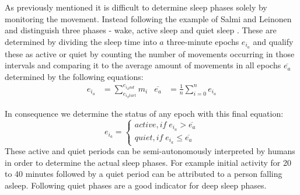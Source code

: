 As previously mentioned it is difficult to determine sleep phases solely by monitoring the movement. Instead following the example of Salmi and Leinonen and distinguish three phases - wake, active sleep and quiet sleep \cite{salmi86}. These are determined by dividing the sleep time into $a$ three-minute epochs $e_{i_a}$ and qualify these as active or quiet by counting the number of movements occurring in those intervals and comparing it to the average amount of movements in all epochs $\overline{e_a}$ determined by the following equations:
\begin{align}
e_{i_a}&=\sum_{e_{i_Start}}^{e_{i_End}}{m_i} & \overline{e_a}&=\frac{1}{n}\sum_{i=0}^n{e_{i_a}}
\end{align}

In consequence we determine the status of any epoch with this final equation:
\begin{equation}
e_{i_a}=\left\{\begin{matrix}
active,if \; e_{i_a}>\overline{e_a}\\ 
quiet,if \; e_{i_a}\leq \overline{e_a}
\end{matrix}\right.
\end{equation}
These active and quiet periods can be semi-autonomously interpreted by humans in order to determine the actual sleep phases. For example initial activity for 20 to 40 minutes followed by a quiet period can be attributed to a person falling asleep. Following quiet phases are a good indicator for deep sleep phases.
 
